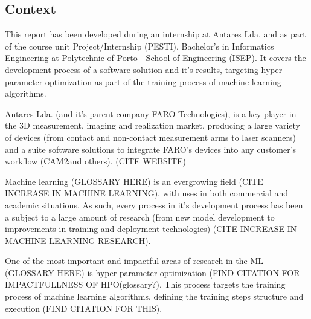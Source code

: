 
\subsection{Context}

This report has been developed during an internship at Antares Lda. and as part of the course unit Project/Internship (PESTI), Bachelor's in Informatics Engineering at Polytechnic of Porto - School of Engineering (ISEP). It covers the development process of a software solution and it's results, targeting hyper parameter optimization as part of the training process of machine learning algorithms.

Antares Lda. (and it's parent company FARO Technologies), is a key player in the 3D measurement, imaging and realization market, producing a large variety of devices (from contact and non-contact measurement arms to laser scanners) and a suite software solutions to integrate FARO's devices into any customer's workflow (CAM2\texttrademark and others). (CITE WEBSITE)
 
Machine learning (GLOSSARY HERE) is an evergrowing field (CITE INCREASE IN MACHINE LEARNING), with uses in both commercial and academic situations. As such, every process in it's development process has been a subject to a large amount of research (from new model development to improvements in training and deployment technologies) (CITE INCREASE IN MACHINE LEARNING RESEARCH).

One of the most important and impactful areas of research in the ML (GLOSSARY HERE) is hyper parameter optimization (FIND CITATION FOR IMPACTFULLNESS OF HPO(glossary?). This process targets the training process of machine learning algorithms, defining the training steps structure and execution (FIND CITATION FOR THIS).